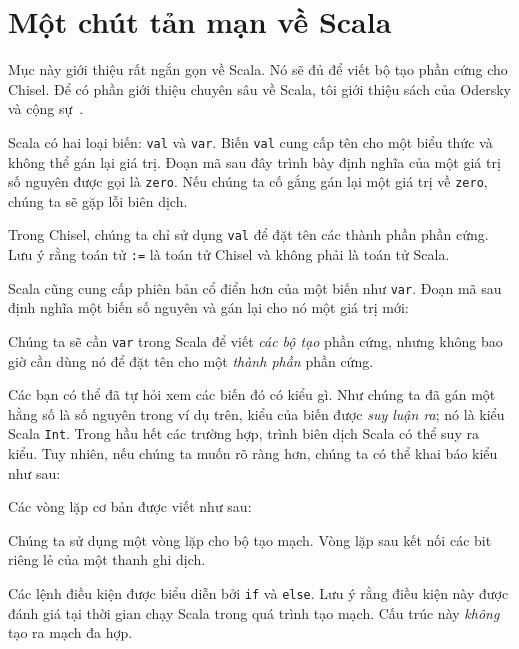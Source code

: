 \documentclass[%
    10pt,
    headinclude, footexclude,
    openright, %
    notitlepage,
    cleardoubleempty,
    headsepline,
    pointlessnumbers,
    bibtotoc, idxtotoc,
    ]{scrbook}
\newcommand{\code}[1]{{\small{\texttt{#1}}}}
\begin{document}
\section{Một chút tản mạn về Scala}

Mục này giới thiệu rất ngắn gọn về Scala. Nó sẽ đủ để viết bộ tạo phần cứng cho Chisel. Để có phần giới thiệu chuyên sâu về Scala, tôi giới thiệu sách của Odersky và cộng sự~\cite{Scala}.

Scala có hai loại biến: \code{val} và \code{var}. Biến \code{val} cung cấp tên cho một biểu thức và không thể gán lại giá trị. Đoạn mã sau đây trình bày định nghĩa của một giá trị số nguyên được gọi là \code{zero}. Nếu chúng ta cố gắng gán lại một giá trị về \code{zero}, chúng ta sẽ gặp lỗi biên dịch. 


\noindent Trong Chisel, chúng ta chỉ sử dụng \code{val} để đặt tên các thành phần phần cứng. Lưu ý rằng toán tử \code{:=} là toán tử Chisel và không phải là toán tử Scala.

Scala cũng cung cấp phiên bản cổ điển hơn của một biến như \code{var}. Đoạn mã sau định nghĩa một biến số nguyên và gán lại cho nó một giá trị mới: 


\noindent Chúng ta sẽ cần \code{var} trong Scala để viết \emph{các bộ tạo} phần cứng, nhưng không bao giờ cần dùng nó để đặt tên cho một \emph{thành phần} phần cứng.

Các bạn có thể đã tự hỏi xem các biến đó có kiểu gì. Như chúng ta đã gán một hằng số là số nguyên trong ví dụ trên, kiểu của biến được \emph{suy luận ra}; nó là kiểu Scala \code{Int}. Trong hầu hết các trường hợp, trình biên dịch Scala có thể suy ra kiểu. Tuy nhiên, nếu chúng ta muốn rõ ràng hơn, chúng ta có thể khai báo kiểu như sau: 


Các vòng lặp cơ bản được viết như sau:


Chúng ta sử dụng một vòng lặp cho bộ tạo mạch. Vòng lặp sau kết nối các bit riêng lẻ của một thanh ghi dịch. 


Các lệnh điều kiện được biểu diễn bởi \code{if} và \code{else}. Lưu ý rằng điều kiện này được đánh giá tại thời gian chạy Scala trong quá trình tạo mạch. Cấu trúc này \emph{không} tạo ra mạch đa hợp.
\end{document}
